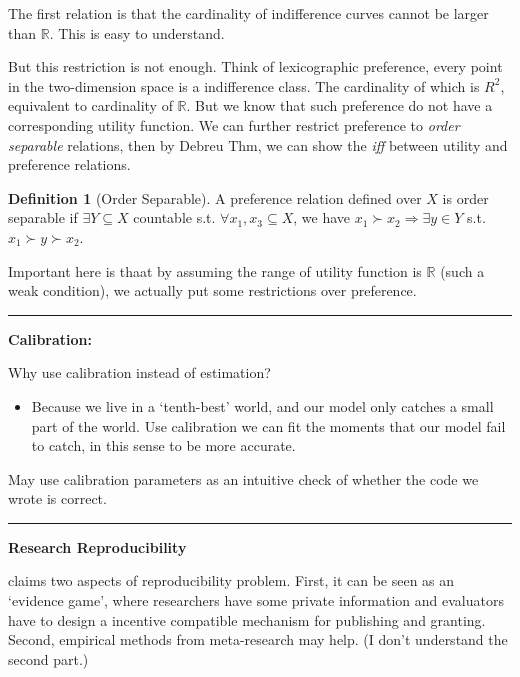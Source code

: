 \documentclass{book}
\theoremstyle{plain}
\theoremstyle{definition}
\newtheorem{defn}{Definition}[section] %
\newcommand{\R}{\mathbb{R}}			%
\newcommand{\myline}{\vspace{3mm} \hrule \vspace{4mm}}
\begin{document}
The first relation is that the cardinality of indifference curves cannot be larger than $\R$.
This is easy to understand.

But this restriction is not enough.
Think of lexicographic preference,
every point in the two-dimension space is a indifference class.
The cardinality of which is $R^2$, equivalent to cardinality of $\R$.
But we know that such preference do not have a corresponding utility function.
We can further restrict preference to \textit{order separable} relations,
then by Debreu Thm, we can show the \textit{iff} between utility and preference relations.

\begin{defn}[Order Separable]
A preference relation defined over $X$ is order separable if $\exists Y \subseteq X$ countable s.t. $\forall x_1,x_3 \subseteq X$,
we have $x_1 \succ x_2 \Rightarrow \exists y \in Y$
 s.t. $x_1 \succ y \succ x_2$.
\end{defn}

Important here is thaat by assuming the range of utility function is $\R$ (such a weak condition),
we actually put some restrictions over preference.

\vspace{3mm}
\hrule
\vspace{3mm}

\vspace{2mm}
\noindent
\textbf{Calibration:}

\noindent
Why use calibration instead of estimation?
\begin{itemize}
	\item Because we live in a `tenth-best' world, and our model only catches a small part of the world.
	Use calibration we can fit the moments that our model fail to catch,
	in this sense to be more accurate.
\end{itemize}

May use calibration parameters as an intuitive check of whether the code we wrote is correct.


\myline

\noindent
\textbf{Research Reproducibility}

\cite{Maniadis:2017gq} claims two aspects of reproducibility problem.
First, it can be seen as an `evidence game', 
where researchers have some private information
and evaluators have to design a incentive compatible mechanism for publishing and granting.
Second, empirical methods from meta-research may help. 
(I don't understand the second part.)
\end{document}
